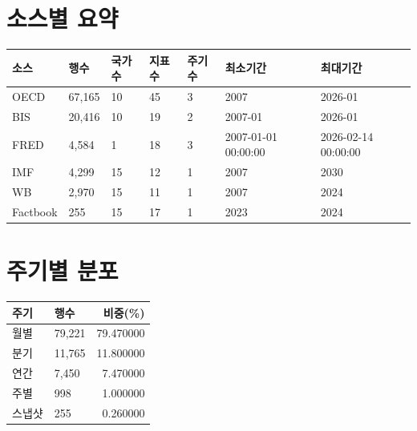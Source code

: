 \documentclass[11pt,a4paper]{article}
\begin{document}
\section{소스별 요약}
\begin{tabular}{lllllll}
\toprule
소스 & 행수 & 국가수 & 지표수 & 주기수 & 최소기간 & 최대기간 \\
\midrule
OECD & 67,165 & 10 & 45 & 3 & 2007 & 2026-01 \\
BIS & 20,416 & 10 & 19 & 2 & 2007-01 & 2026-01 \\
FRED & 4,584 & 1 & 18 & 3 & 2007-01-01 00:00:00 & 2026-02-14 00:00:00 \\
IMF & 4,299 & 15 & 12 & 1 & 2007 & 2030 \\
WB & 2,970 & 15 & 11 & 1 & 2007 & 2024 \\
Factbook & 255 & 15 & 17 & 1 & 2023 & 2024 \\
\bottomrule
\end{tabular}


\section{주기별 분포}
\begin{tabular}{llr}
\toprule
주기 & 행수 & 비중(\%) \\
\midrule
월별 & 79,221 & 79.470000 \\
분기 & 11,765 & 11.800000 \\
연간 & 7,450 & 7.470000 \\
주별 & 998 & 1.000000 \\
스냅샷 & 255 & 0.260000 \\
\bottomrule
\end{tabular}
\end{document}
